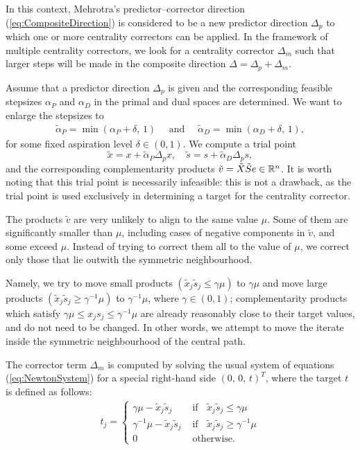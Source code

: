 In this context, Mehrotra's predictor--corrector direction 
(\ref{eq:CompositeDirection}) is considered to be a new predictor direction
$\Delta_p$ to which one or more centrality correctors can be applied. 
In the framework of multiple centrality correctors, we look for a 
centrality corrector $\Delta_m$ such that larger
steps will be made in the composite direction $\Delta = \Delta_p + \Delta_m$.

Assume that a predictor direction $\Delta_p$ is given and the corresponding
feasible stepsizes $\alpha_{P}$ and $\alpha_{D}$ 
in the primal and dual spaces are determined. 
We want to enlarge the stepsizes to 
%
\begin{eqnarray*} 
   \tilde{\alpha}_{P} = \min(\alpha_{P} \! + \! \delta, \,1) 
   \quad \mbox{ and } \quad
   \tilde{\alpha}_{D} = \min(\alpha_{D} \! + \! \delta, \,1), 
\end{eqnarray*}
%
for some fixed aspiration level $\delta \in(0,1)$. We compute a trial point
%
\[
  \tilde{x} = x + \tilde{\alpha}_{P} \Delta_{p} x, \quad 
  \tilde{s} = s + \tilde{\alpha}_{D} \Delta_{p} s,
\]
%
and the corresponding complementarity products 
$\tilde v = \tilde X \tilde S e \in \mathbb{R}^{n}$.
It is worth noting that this trial point is necessarily infeasible: 
this is not a drawback, as the trial point is used exclusively in
determining a target for the centrality corrector.

The products $\tilde v$ are very unlikely to align to the same value $\mu$.
Some of them are significantly smaller than $\mu$, 
including cases of negative components in $\tilde v$, 
and some exceed $\mu$. Instead of trying to correct 
them all to the value of $\mu$, we correct only those that
lie outwith the symmetric neighbourhood.

Namely, we try to move small products 
$(\tilde x_j \tilde s_j \leq \gamma \mu)$ to $\gamma \mu$ and move 
large products $(\tilde x_j \tilde s_j \geq \gamma^{-1} \mu)$ 
to $\gamma^{-1} \mu$, where $\gamma \in (0,1)$;
complementarity products 
which satisfy $\gamma \mu \leq x_j s_j \leq \gamma^{-1} \mu$ are
already reasonably close to their target values, and 
do not need to be changed. 
In other words, we attempt to move the iterate inside the symmetric
neighbourhood of the central path.

The corrector term $\Delta_m$ is computed by solving the usual 
system of equations (\ref{eq:NewtonSystem}) for a special right-hand side
$(0, \,0,\, t)^T$, where the target $t$ is defined as follows:
%
\begin{eqnarray} \label{eq:Target}
  t_j = \left\{
  \begin{array}{ll}
    \gamma \mu - \tilde x_j \tilde s_j  
    & \mbox{ if } \;\; \tilde x_j \tilde s_j \leq \gamma \mu  \\
    \gamma^{-1} \mu - \tilde x_j \tilde s_j  
    & \mbox{ if } \;\; \tilde x_j \tilde s_j \geq \gamma^{-1} \mu  \\
    0    
    & \mbox{ otherwise.}
  \end{array}
  \right.
\end{eqnarray}

